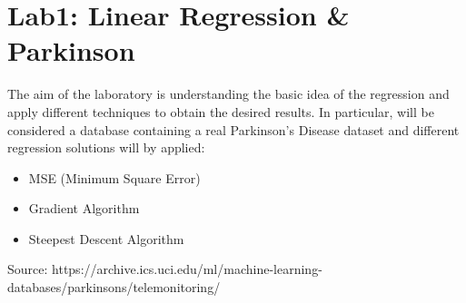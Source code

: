 \documentclass[12pt]{article}
\begin{document}

\tableofcontents
\newpage

\section{Lab1: Linear Regression \& Parkinson}
The aim of the laboratory is understanding the basic idea of the regression and apply different techniques to obtain the desired results. In particular, will be considered a database containing a real Parkinson's Disease dataset and different regression solutions will by applied:
\begin{itemize}
\item MSE (Minimum Square Error)
\item Gradient Algorithm
\item Steepest Descent Algorithm
\end{itemize} 
Source: \footnotesize{ https://archive.ics.uci.edu/ml/machine-learning-databases/parkinsons/telemonitoring/}
\end{document}
